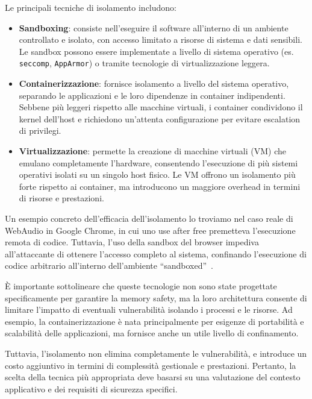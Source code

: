 Le principali tecniche di isolamento includono:
\begin{itemize}
  \item \textbf{Sandboxing}: consiste nell'eseguire il software all'interno di un
    ambiente controllato e isolato, con accesso limitato a risorse di sistema e
    dati sensibili. Le sandbox possono essere implementate a livello di sistema operativo
    (es. \texttt{seccomp}, \texttt{AppArmor}) o tramite tecnologie di virtualizzazione
    leggera.

  \item \textbf{Containerizzazione}: fornisce isolamento a livello del sistema operativo,
    separando le applicazioni e le loro dipendenze in container indipendenti. Sebbene
    più leggeri rispetto alle macchine virtuali, i container condividono il
    kernel dell'host e richiedono un'attenta configurazione per evitare
    escalation di privilegi.

  \item \textbf{Virtualizzazione}: permette la creazione di macchine virtuali (VM)
    che emulano completamente l'hardware, consentendo l'esecuzione di più
    sistemi operativi isolati su un singolo host fisico. Le VM offrono un isolamento
    più forte rispetto ai container, ma introducono un maggiore overhead in
    termini di risorse e prestazioni.
\end{itemize}

Un esempio concreto dell'efficacia dell'isolamento lo troviamo nel caso reale di
WebAudio in Google Chrome, in cui uno use after free premetteva l'esecuzione remota
di codice. Tuttavia, l'uso della sandbox del browser impediva all'attaccante di ottenere
l'accesso completo al sistema, confinando l'esecuzione di codice arbitrario all'interno
dell'ambiente ``sandboxed''~\cite{webaudio_uaf}.

È importante sottolineare che queste tecnologie non sono state progettate
specificamente per garantire la memory safety, ma la loro architettura consente di
limitare l'impatto di eventuali vulnerabilità isolando i processi e le risorse.
Ad esempio, la containerizzazione è nata principalmente per esigenze di portabilità
e scalabilità delle applicazioni, ma fornisce anche un utile livello di
confinamento.

Tuttavia, l'isolamento non elimina completamente le vulnerabilità, e introduce
un costo aggiuntivo in termini di complessità gestionale e prestazioni. Pertanto,
la scelta della tecnica più appropriata deve basarsi su una valutazione del
contesto applicativo e dei requisiti di sicurezza specifici.